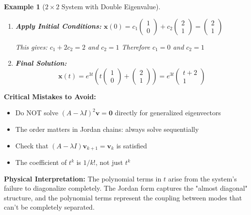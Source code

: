 \documentclass[12pt]{article}
\newtheorem{example}{Example}
\begin{document}
\begin{example}[$2\times2$ System with Double Eigenvalue]
\begin{enumerate}
\item \textbf{Apply Initial Conditions:}
$\mathbf{x}(0) = c_{1}\begin{pmatrix} 1 \\ 0 \end{pmatrix} + c_{2}\begin{pmatrix} 2 \\ 1 \end{pmatrix} = \begin{pmatrix} 2 \\ 1 \end{pmatrix}$

This gives: $c_{1} + 2c_{2} = 2$ and $c_{2} = 1$
Therefore $c_{1} = 0$ and $c_{2} = 1$

\item \textbf{Final Solution:}
\[\mathbf{x}(t) = e^{3t}\left(t\begin{pmatrix} 1 \\ 0 \end{pmatrix} + \begin{pmatrix} 2 \\ 1 \end{pmatrix}\right) = e^{3t}\begin{pmatrix} t + 2 \\ 1 \end{pmatrix}\]
\end{enumerate}
\end{example}

\begin{warning}
\textbf{Critical Mistakes to Avoid:}
\begin{itemize}
\item Do NOT solve $(A - \lambda I)^{2}\mathbf{v} = \mathbf{0}$ directly for generalized eigenvectors
\item The order matters in Jordan chains: always solve sequentially
\item Check that $(A - \lambda I)\mathbf{v}_{k+1} = \mathbf{v}_{k}$ is satisfied
\item The coefficient of $t^{k}$ is $1/k!$, not just $t^{k}$
\end{itemize}
\end{warning}

\begin{insight}
\textbf{Physical Interpretation:}
The polynomial terms in $t$ arise from the system's failure to diagonalize completely. The Jordan form captures the "almost diagonal" structure, and the polynomial terms represent the coupling between modes that can't be completely separated.
\end{insight}
\end{document}
